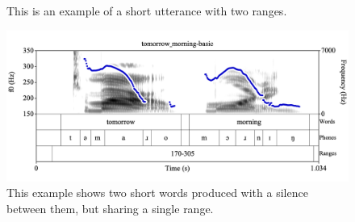 \documentclass[11pt, twoside]{memoir}
\begin{document}
{{\begin{figure}[H]
\caption{This is an example of a short utterance with two ranges.
\label{fig:no_cigar Ranges basic}
}
\end{figure}
\begin{figure}[H]
\centering
\includegraphics[width=.875\linewidth]{Ranges-tomorrow_morning-basic.png}
\caption{This example shows two short words produced with a silence between them, but sharing a single range.
\label{fig:tomorrow_morning Ranges basic}
}
\end{figure}
}}
\end{document}
